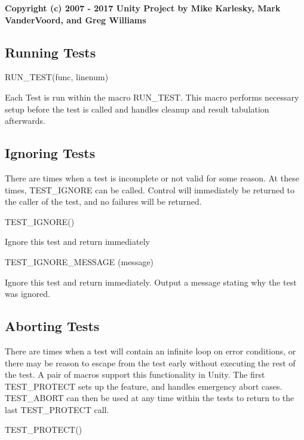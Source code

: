 \href{https://travis-ci.org/ThrowTheSwitch/Unity}{\tt } {\bfseries Copyright (c) 2007 -\/ 2017 Unity Project by Mike Karlesky, Mark Vander\+Voord, and Greg Williams}

\subsection*{Running Tests }

\begin{DoxyVerb}RUN_TEST(func, linenum)
\end{DoxyVerb}


Each Test is run within the macro {\ttfamily R\+U\+N\+\_\+\+T\+E\+ST}. This macro performs necessary setup before the test is called and handles cleanup and result tabulation afterwards.

\subsection*{Ignoring Tests }

There are times when a test is incomplete or not valid for some reason. At these times, T\+E\+S\+T\+\_\+\+I\+G\+N\+O\+RE can be called. Control will immediately be returned to the caller of the test, and no failures will be returned. \begin{DoxyVerb}TEST_IGNORE()
\end{DoxyVerb}


Ignore this test and return immediately \begin{DoxyVerb}TEST_IGNORE_MESSAGE (message)
\end{DoxyVerb}


Ignore this test and return immediately. Output a message stating why the test was ignored.

\subsection*{Aborting Tests }

There are times when a test will contain an infinite loop on error conditions, or there may be reason to escape from the test early without executing the rest of the test. A pair of macros support this functionality in Unity. The first {\ttfamily T\+E\+S\+T\+\_\+\+P\+R\+O\+T\+E\+CT} sets up the feature, and handles emergency abort cases. {\ttfamily T\+E\+S\+T\+\_\+\+A\+B\+O\+RT} can then be used at any time within the tests to return to the last {\ttfamily T\+E\+S\+T\+\_\+\+P\+R\+O\+T\+E\+CT} call. \begin{DoxyVerb}TEST_PROTECT()
\end{DoxyVerb}


